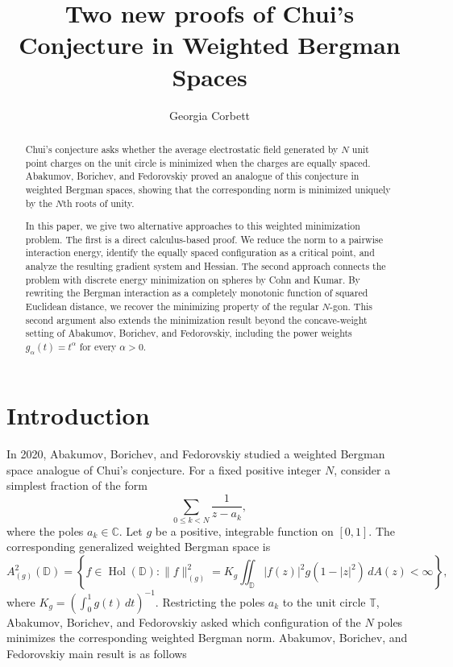 \documentclass{article}
\title{Two new proofs of Chui's Conjecture in Weighted Bergman Spaces}
\author{Georgia Corbett}
\begin{document}
\maketitle

\begin{abstract}
Chui's conjecture asks whether the average electrostatic field generated by $N$ unit point charges on the unit circle is minimized when the charges are equally spaced. Abakumov, Borichev, and Fedorovskiy proved an analogue of this conjecture in weighted Bergman spaces, showing that the corresponding norm is minimized uniquely by the $N$th roots of unity. 

In this paper, we give two alternative approaches to this weighted minimization problem. The first is a direct calculus-based proof. We reduce the norm to a pairwise interaction energy, identify the equally spaced configuration as a critical point, and analyze the resulting gradient system and Hessian. The second approach connects the problem with discrete energy minimization on spheres by Cohn and Kumar. By rewriting the Bergman interaction as a completely monotonic function of squared Euclidean distance, we recover the minimizing property of the regular $N$-gon. This second argument also extends the minimization result beyond the concave-weight setting of Abakumov, Borichev, and Fedorovskiy, including the power weights $g_\alpha(t)=t^\alpha$ for every $\alpha>0$.
\end{abstract}
\section{Introduction}

In 2020, Abakumov, Borichev, and Fedorovskiy studied a weighted Bergman space analogue of Chui's conjecture. For a fixed positive integer $N$, consider a simplest fraction of the form
\[
\sum_{0\leq k<N}\frac{1}{z-a_k},
\]
where the poles $a_k\in\mathbb{C}$. Let $g$ be a positive, integrable function on $[0,1]$. The corresponding generalized weighted Bergman space is
\[
A^2_{(g)}(\mathbb{D})=\left\{f\in\operatorname{Hol}(\mathbb{D}):\|f\|_{(g)}^2=K_g\iint_{\mathbb{D}}|f(z)|^2 g(1-|z|^2)\,dA(z)<\infty\right\},
\]
where $K_g=\left(\int_0^1 g(t)\,dt\right)^{-1}.$ Restricting the poles $a_k$ to the unit circle $\mathbb{T}$, Abakumov, Borichev, and Fedorovskiy asked which configuration of the $N$ poles minimizes the corresponding weighted Bergman norm. Abakumov, Borichev, and Fedorovskiy main result is as follows
\end{document}
